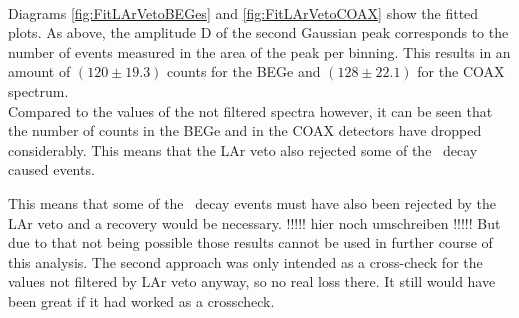 \documentclass[encoding=utf8,british]{tumphthesis}
\begin{document}

\\

Diagrams \ref{fig:FitLArVetoBEGes} and \ref{fig:FitLArVetoCOAX} show the fitted plots.
As above, the amplitude D of the second Gaussian peak corresponds to the number of events measured in the area of the peak per binning.
This results in an amount of $(120\pm19.3)$ counts for the BEGe and $(128\pm22.1)$ for the COAX spectrum.
\\

Compared to the values of the not filtered spectra however, it can be seen that the number of counts in the BEGe and in the COAX detectors have dropped considerably.
This means that the LAr veto also rejected some of the \Kr\ decay caused events.

This means that some of the  \Kr\ decay events must have also been rejected by the LAr veto and a recovery would be necessary. !!!!! hier noch umschreiben !!!!!
But due to that not being possible those results cannot be used in further course of this analysis.
The second approach was only intended as a cross-check for the values not filtered by LAr veto anyway, so no real loss there.
It still would have been great if it had worked as a crosscheck.
\\
\end{document}
